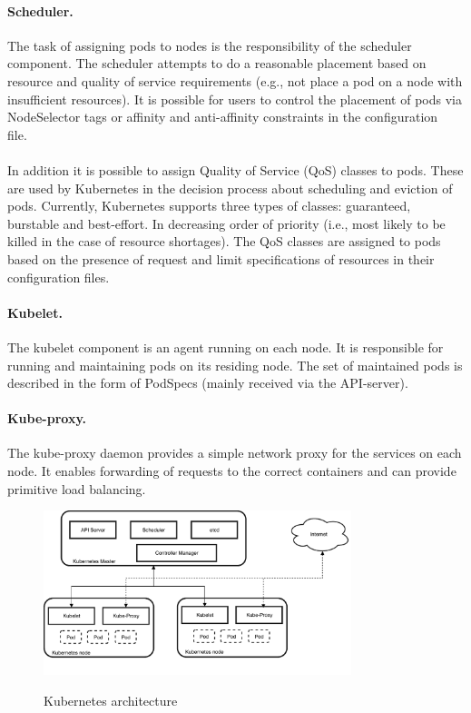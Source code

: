 \paragraph{Scheduler.} The task of assigning pods to nodes is the responsibility of the scheduler component.  The scheduler attempts to do a reasonable placement based on resource and quality of service requirements (e.g., not place a pod on a node with insufficient resources). It is  possible for users to control the placement of pods via NodeSelector tags or affinity and anti-affinity constraints in the configuration file.~\cite{kubernetes-pods-to-nodes,kubernetes-scheduler}
\\\\In addition it is possible to assign Quality of Service (QoS) classes to pods. These are used by Kubernetes in the decision process about scheduling and eviction of pods. Currently, Kubernetes supports three types of classes: guaranteed, burstable and best-effort. In decreasing order of priority (i.e., most likely to be killed in the case of resource shortages). The QoS classes are assigned to pods based on the presence of request and limit specifications of resources in their configuration files.~\cite{kubernetes-qos}


\paragraph{Kubelet.} The kubelet component is an agent running on each node. It is responsible for running and maintaining pods on its residing node. The set of maintained pods is described in the form of PodSpecs (mainly received via the API-server).~\cite{kubernetes-kubelet}
\paragraph{Kube-proxy.} The kube-proxy daemon provides a simple network proxy for the services on each node. It enables forwarding of requests to the correct containers and can provide primitive load balancing.~\cite{kubernetes-kubeproxy}
\begin{figure}[H]
\caption{Kubernetes architecture}
\centering
\includegraphics[width=0.8\textwidth]{chapter-background/kubernetes-architecture-diagram.pdf}
\label{fig:kubarch}
\end{figure}
 
